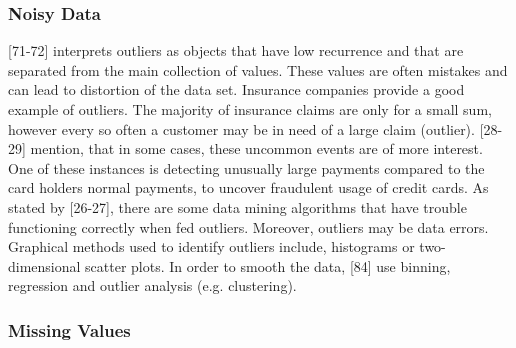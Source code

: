 \subsubsection{Noisy Data}
\label{section:NoisyData}
\textcite{dataPreparationForDataMining}[71-72] interprets outliers as objects that have low recurrence and that are separated from the main collection of values. These values are often mistakes and can lead to distortion of the data set. Insurance companies provide a good example of outliers. The majority of insurance claims are only for a small sum, however every so often a customer may be in need of a large claim (outlier). \textcite{han2011data}[28-29] mention, that in some cases, these uncommon events are of more interest. One of these instances is detecting unusually large payments compared to the card holders normal payments, to uncover fraudulent usage of credit cards. As stated by \textcite{DataMiningAndPredictiveAnalytics}[26-27], there are some data mining algorithms that have trouble functioning correctly when fed outliers. Moreover, outliers may be data errors. Graphical methods used to identify outliers include, histograms or two-dimensional scatter plots. In order to smooth the data, \textcite{han2011data}[84] use binning, regression and outlier analysis (e.g. clustering).




\subsubsection{Missing Values}
\label{section:MissingValues}

